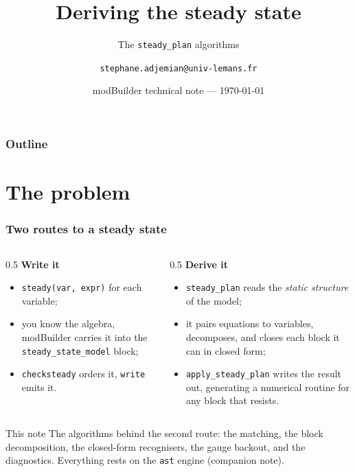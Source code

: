 \documentclass[10pt,slidestop]{beamer}
\title{Deriving the steady state}
\subtitle{The \texttt{steady\_plan} algorithms}
\author{\texttt{stephane.adjemian@univ-lemans.fr}}
\date{modBuilder technical note --- \today}
\newcommand{\code}[1]{\texttt{#1}}
\begin{document}
\begin{frame}\titlepage\end{frame}
\begin{frame}\frametitle{Outline}\tableofcontents\end{frame}

\section{The problem}

\begin{frame}\frametitle{Two routes to a steady state}
  \begin{columns}[t]
  \begin{column}{0.5\textwidth}
    \textbf{Write it}
    \begin{itemize}\small
    \item \code{steady(var, expr)} for each variable;
    \item you know the algebra, modBuilder carries it into the
      \code{steady\_state\_model} block;
    \item \code{checksteady} orders it, \code{write} emits it.
    \end{itemize}
  \end{column}
  \begin{column}{0.5\textwidth}
    \textbf{Derive it}
    \begin{itemize}\small
    \item \code{steady\_plan} reads the \emph{static structure} of the model;
    \item it pairs equations to variables, decomposes, and closes each block it
      can in closed form;
    \item \code{apply\_steady\_plan} writes the result out, generating a
      numerical routine for any block that resists.
    \end{itemize}
  \end{column}
  \end{columns}

  \vfill
  \begin{block}{This note}
    The algorithms behind the second route: the matching, the block
    decomposition, the closed-form recognisers, the gauge backout, and the
    diagnostics. Everything rests on the \code{ast} engine (companion note).
  \end{block}
\end{frame}
\end{document}
